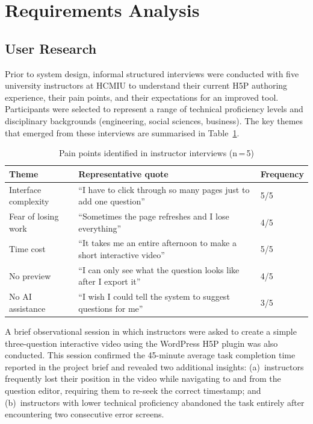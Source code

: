 \section{Requirements Analysis}

\subsection{User Research}

Prior to system design, informal structured interviews were conducted with
five university instructors at HCMIU to understand their current H5P
authoring experience, their pain points, and their expectations for an
improved tool. Participants were selected to represent a range of technical
proficiency levels and disciplinary backgrounds (engineering, social
sciences, business). The key themes that emerged from these interviews are
summarised in Table~\ref{tab:pain_points}.

\begin{table}[H]
  \centering
  \caption{Pain points identified in instructor interviews (n\,=\,5)}
  \label{tab:pain_points}
  \begin{tabularx}{\linewidth}{lXl}
    \toprule
    \textbf{Theme} & \textbf{Representative quote} & \textbf{Frequency} \\
    \midrule
    Interface complexity & ``I have to click through so many pages just to add one question'' & 5/5 \\
    Fear of losing work  & ``Sometimes the page refreshes and I lose everything'' & 4/5 \\
    Time cost            & ``It takes me an entire afternoon to make a short interactive video'' & 5/5 \\
    No preview           & ``I can only see what the question looks like after I export it'' & 4/5 \\
    No AI assistance     & ``I wish I could tell the system to suggest questions for me'' & 3/5 \\
    \bottomrule
  \end{tabularx}
\end{table}

A brief observational session in which instructors were asked to create a
simple three-question interactive video using the WordPress H5P plugin was
also conducted. This session confirmed the 45-minute average task completion
time reported in the project brief and revealed two additional insights:
(a)~instructors frequently lost their position in the video while navigating
to and from the question editor, requiring them to re-seek the correct
timestamp; and (b)~instructors with lower technical proficiency abandoned
the task entirely after encountering two consecutive error screens.

